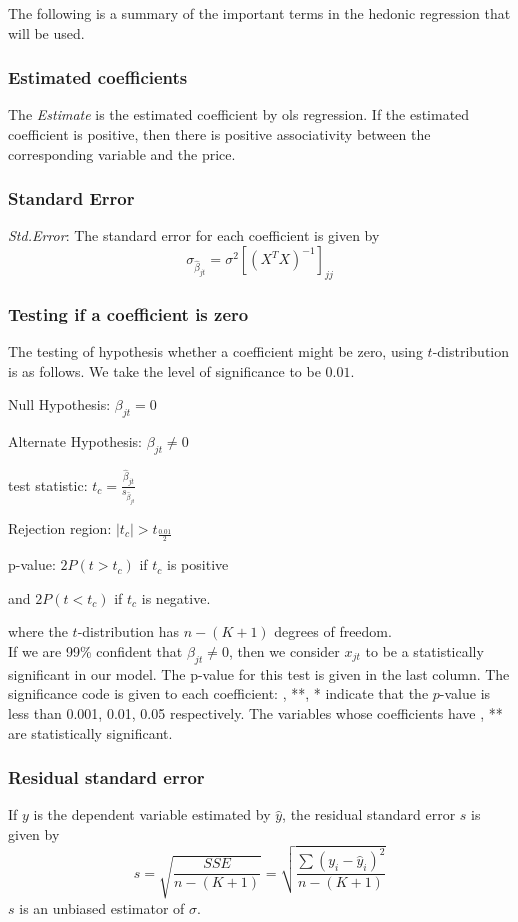 \documentclass[12pt]{article}
\begin{document}
The following is a summary of the important terms in the hedonic regression that will be used.
\subsubsection{Estimated coefficients} The \textit{Estimate} is the estimated coefficient by \acrshort{ols} regression. If the estimated coefficient is positive, then there is positive associativity between the corresponding variable and the price.
\subsubsection{Standard Error} \textit{Std.Error}: The standard error for each coefficient is given by
$$\sigma_{\hat \beta_{jt}}=\sigma^2[(X^TX)^{-1}]_{jj}$$
\subsubsection{Testing if a coefficient is zero} The testing of hypothesis whether a coefficient might be zero, using $t$-distribution is as follows.  We take the level of significance to be $0.01$.
    \begin{center}
        Null Hypothesis: $\beta_{jt}=0$
        
        Alternate Hypothesis: $\beta_{jt}\neq 0$
        
        test statistic: $t_c=\frac{\hat \beta_{jt}}{s_{\hat \beta_{jt}}}$
        
        Rejection region: $|t_c|>t_{\frac{0.01}{2}}$
        
        p-value: $2P(t>t_c)$ if $t_c$ is positive 
        
        and $2P(t<t_c)$ if $t_c$ is negative.
    \end{center} 
where the $t$-distribution has $n-(K+1)$ degrees of freedom.
\\ If we are 99\% confident that $\beta_{jt}\neq 0$, then we consider $x_{jt}$ to be a statistically significant in our model.
The p-value for this test is given in the last column. The significance code is given to each coefficient: , **, * indicate that the $p$-value is less than 0.001, 0.01, 0.05 respectively. The variables whose coefficients have , ** are statistically significant.
\subsubsection{{Residual standard error}} If $y$ is the dependent variable estimated by $\hat y$, the residual standard error $s$ is given by
$$s=\sqrt{\frac{SSE}{n-(K+1)}}=\sqrt{\frac{\sum {(y_i-\hat y_i)^2}}{n-(K+1)}}$$
$s$ is an unbiased estimator of $\sigma$.
\end{document}
